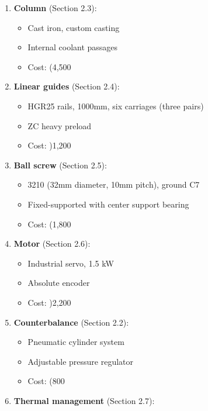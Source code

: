 \documentclass[
]{article}
\providecommand{\tightlist}{%
  \setlength{\itemsep}{0pt}\setlength{\parskip}{0pt}}
\begin{document}
\begin{enumerate}
\def\labelenumi{\arabic{enumi}.}
\tightlist
\item
  \textbf{Column} (Section 2.3):

  \begin{itemize}
  \tightlist
  \item
    Cast iron, custom casting
  \item
    Internal coolant passages
  \item
    Cost: (4,500
  \end{itemize}
\item
  \textbf{Linear guides} (Section 2.4):

  \begin{itemize}
  \tightlist
  \item
    HGR25 rails, 1000mm, six carriages (three pairs)
  \item
    ZC heavy preload
  \item
    Cost: )1,200
  \end{itemize}
\item
  \textbf{Ball screw} (Section 2.5):

  \begin{itemize}
  \tightlist
  \item
    3210 (32mm diameter, 10mm pitch), ground C7
  \item
    Fixed-supported with center support bearing
  \item
    Cost: (1,800
  \end{itemize}
\item
  \textbf{Motor} (Section 2.6):

  \begin{itemize}
  \tightlist
  \item
    Industrial servo, 1.5 kW
  \item
    Absolute encoder
  \item
    Cost: )2,200
  \end{itemize}
\item
  \textbf{Counterbalance} (Section 2.2):

  \begin{itemize}
  \tightlist
  \item
    Pneumatic cylinder system
  \item
    Adjustable pressure regulator
  \item
    Cost: (800
  \end{itemize}
\item
  \textbf{Thermal management} (Section 2.7):


\end{enumerate}
\end{document}
